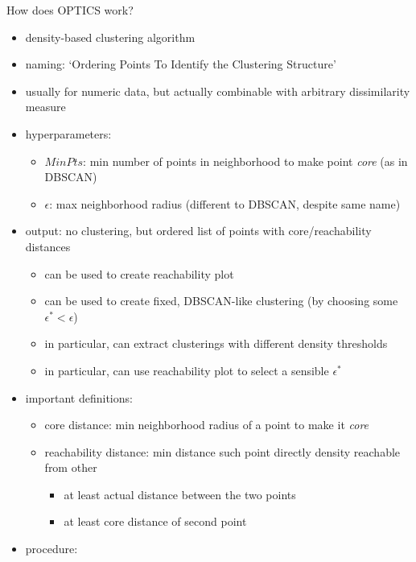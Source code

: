 \documentclass[12pt]{article}
\begin{document}
\begin{question}
	How does OPTICS work?
\end{question}

\begin{itemize}[left=0pt, nosep]
	\item density-based clustering algorithm
	\item naming: `Ordering Points To Identify the Clustering Structure'
	\item usually for numeric data, but actually combinable with arbitrary dissimilarity measure
	\item hyperparameters:
	\begin{itemize}[left=0pt, nosep]
		\item $MinPts$: min number of points in neighborhood to make point \emph{core} (as in DBSCAN)
		\item $\epsilon$: max neighborhood radius (different to DBSCAN, despite same name)
	\end{itemize}
	\item output: no clustering, but ordered list of points with core/reachability distances
	\begin{itemize}[left=0pt, nosep]
		\item can be used to create reachability plot
		\item can be used to create fixed, DBSCAN-like clustering (by choosing some $\epsilon^* < \epsilon$)
		\item in particular, can extract clusterings with different density thresholds
		\item in particular, can use reachability plot to select a sensible $\epsilon^*$
	\end{itemize}
	\item important definitions:
	\begin{itemize}[left=0pt, nosep]
		\item core distance: min neighborhood radius of a point to make it \emph{core}
		\item reachability distance: min distance such point directly density reachable from other
		\begin{itemize}[left=0pt, nosep]
			\item at least actual distance between the two points
			\item at least core distance of second point
		\end{itemize}
	\end{itemize}
	\item procedure:
	\begin{itemize}[left=0pt, nosep]

\end{itemize}
\end{itemize}
\end{document}
